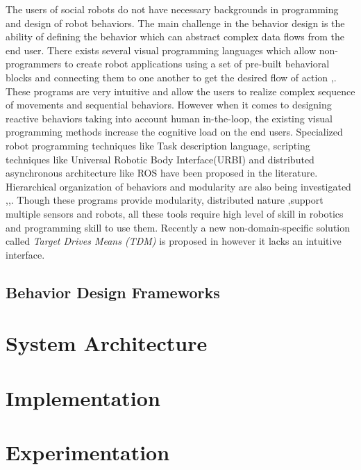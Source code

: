 \documentclass{llncs}
\begin{document}
	The users of social robots do not have necessary backgrounds in programming and design of robot behaviors. The main challenge in the behavior design is the ability of defining the behavior which can abstract complex data flows from the end user. There exists several visual programming languages which allow non-programmers to create robot applications using a set of pre-built behavioral blocks and connecting them to one another to get the desired flow of action \cite{MSRS4},\cite{Choregraphe}. These programs are very intuitive and allow the users to realize complex sequence of movements and sequential behaviors. However when it comes to designing reactive behaviors taking into account human in-the-loop, the existing visual programming methods increase the cognitive load on the end users. Specialized robot programming techniques like Task description language\cite{Simmons724883}, scripting techniques like Universal Robotic Body Interface(URBI)\cite{Baillie4814281} and distributed asynchronous architecture like ROS\cite{quigley2009ros} have been proposed in the literature. Hierarchical organization of behaviors and modularity are also being investigated \cite{Jaegeretal},\cite{Baldassarre:2013:CRM:2560111},\cite{hurdus4648045}. Though these programs provide modularity, distributed nature ,support multiple sensors and robots, all these tools require high level of skill in robotics and programming skill to use them. Recently a new non-domain-specific solution called \emph{Target Drives Means (TDM)} is proposed in \cite{BerenzTDM2014} however it lacks an intuitive interface.
	
\subsection{Behavior Design Frameworks}
%
\section{System Architecture}
%
%
\section{Implementation}
%
%
\section{Experimentation}
%
%
\end{document}
